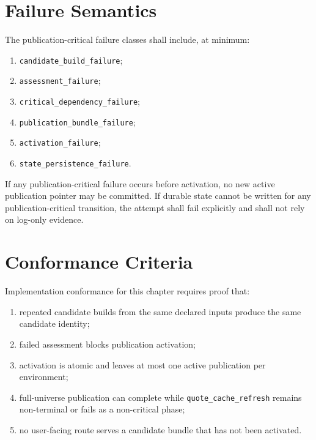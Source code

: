 \section{Failure Semantics}
The publication-critical failure classes shall include, at minimum:
\begin{enumerate}[leftmargin=1.2cm]
    \item \texttt{candidate\_build\_failure};
    \item \texttt{assessment\_failure};
    \item \texttt{critical\_dependency\_failure};
    \item \texttt{publication\_bundle\_failure};
    \item \texttt{activation\_failure};
    \item \texttt{state\_persistence\_failure}.
\end{enumerate}

If any publication-critical failure occurs before activation, no new active publication pointer may be committed. If durable state cannot be written for any publication-critical transition, the attempt shall fail explicitly and shall not rely on log-only evidence.

\section{Conformance Criteria}
Implementation conformance for this chapter requires proof that:
\begin{enumerate}[leftmargin=1.2cm]
    \item repeated candidate builds from the same declared inputs produce the same candidate identity;
    \item failed assessment blocks publication activation;
    \item activation is atomic and leaves at most one active publication per environment;
    \item full-universe publication can complete while \texttt{quote\_cache\_refresh} remains non-terminal or fails as a non-critical phase;
    \item no user-facing route serves a candidate bundle that has not been activated.
\end{enumerate}

